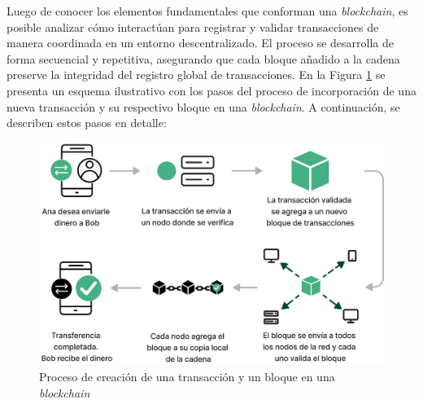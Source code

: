 Luego de conocer los elementos fundamentales que conforman una \textit{blockchain}, es posible analizar cómo interactúan para registrar y validar transacciones de manera coordinada en un entorno descentralizado. El proceso se desarrolla de forma secuencial y repetitiva, asegurando que cada bloque añadido a la cadena preserve la integridad del registro global de transacciones. En la Figura \ref{fig:blockchain-working} se presenta un esquema ilustrativo con los pasos del proceso de incorporación de una nueva transacción y su respectivo bloque en una \textit{blockchain}. A continuación, se describen estos pasos en detalle:

\begin{figure}[!tb]
    \centering
    \includegraphics[width=\textwidth]{Figures/block-creation.png}
    \caption{Proceso de creación de una transacción y un bloque en una \textit{blockchain}}
    \label{fig:blockchain-working}
\end{figure}

